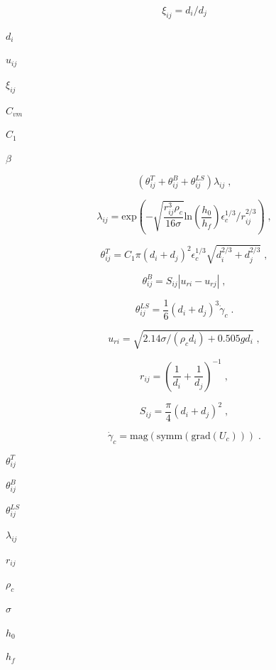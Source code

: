 \documentclass{article}
\begin{document}
\[
    \xi_{ij} = d_i/d_j
\]
\pagebreak

$        d_i         $
\pagebreak

$        u_{ij}      $
\pagebreak

$        \xi_{ij}    $
\pagebreak

$        C_{vm}      $
\pagebreak

$        C_1         $
\pagebreak

$        \beta       $
\pagebreak

\[
    \left( \theta_{ij}^{T} + \theta_{ij}^{B} + \theta_{ij}^{LS} \right)
    \lambda_{ij}\;,
\]
\pagebreak

\[
    \lambda_{ij} =
        \mathrm{exp}
        \left(
          - \sqrt{\frac{r_{ij}^3 \rho_c}{16 \sigma}}
            \mathrm{ln} \left(\frac{h_0}{h_f}\right)
            \epsilon_c^{1/3}/r_{ij}^{2/3}
        \right)\;,
\]
\pagebreak

\[
    \theta_{ij}^{T} =
        C_1 \pi (d_i + d_j)^{2} \epsilon_c^{1/3}
        \sqrt{d_{i}^{2/3} + d_{j}^{2/3}}\;,
\]
\pagebreak

\[
    \theta_{ij}^{B} = S_{ij} \left| u_{ri} - u_{rj} \right|\;,
\]
\pagebreak

\[
    \theta_{ij}^{LS} =
        \frac{1}{6} \left(d_i + d_j\right)^{3} \dot{\gamma}_c\;.
\]
\pagebreak

\[
    u_{ri} = \sqrt{2.14 \sigma / \left(\rho_c d_i \right) + 0.505 g d_i}\;,
\]
\pagebreak

\[
    r_{ij} = \left( \frac{1}{d_i} + \frac{1}{d_j} \right)^{-1}\;,
\]
\pagebreak

\[
    S_{ij} = \frac{\pi}{4} \left(d_i + d_j\right)^{2}\;,
\]
\pagebreak

\[
    \dot{\gamma}_c = \mathrm{mag}(\mathrm{symm}(\mathrm{grad}(U_c)))\;.
\]
\pagebreak

$        \theta_{ij}^{T}   $
\pagebreak

$        \theta_{ij}^{B}   $
\pagebreak

$        \theta_{ij}^{LS}  $
\pagebreak

$        \lambda_{ij}      $
\pagebreak

$        r_{ij}            $
\pagebreak

$        \rho_c            $
\pagebreak

$        \sigma            $
\pagebreak

$        h_0               $
\pagebreak

$        h_f               $
\pagebreak
\end{document}
